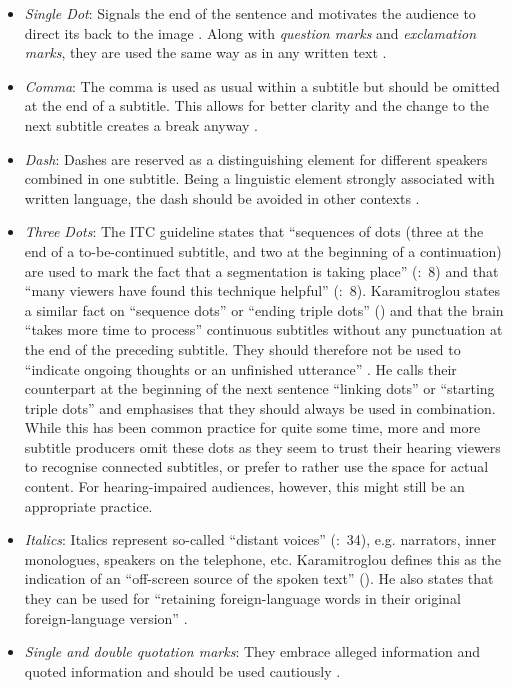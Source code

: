 \begin{itemize}
\item \textit{Single Dot}: Signals the end of the sentence and motivates the audience to direct its  back to the image \citep{Karamitroglou1998}. Along with \textit{question marks} and \textit{exclamation marks}, they are used the same way as in any written text \citep{Karamitroglou1998}.
\item \textit{Comma}: The comma is used as usual within a subtitle but should be omitted at the end of a subtitle. This allows for better clarity and the change to the next subtitle creates a break anyway \citep{Karamitroglou1998}.
\item \textit{Dash}: Dashes are reserved as a distinguishing element for different speakers combined in one subtitle. Being a linguistic element strongly associated with written language, the dash should be avoided in other contexts \citep{Karamitroglou1998}.
\item \textit{Three Dots}: The ITC guideline states that “sequences of dots (three at the end of a to-be-continued subtitle, and two at the beginning of a continuation) are used to mark the fact that a segmentation is taking place” (\citeyear{Itc1999}:~8) and that “many viewers have found this technique helpful” (\citeyear{Itc1999}:~8). Karamitroglou states a similar fact on “sequence dots” or “ending triple dots” (\citeyear{Karamitroglou1998}) and that the brain “takes more time to process” \citep{Karamitroglou1998} continuous subtitles without any punctuation at the end of the preceding subtitle. They should therefore not be used to “indicate ongoing thoughts or an unfinished utterance” \citep{Karamitroglou1998}. He calls their counterpart at the beginning of the next sentence “linking dots” or “starting triple dots” \citep{Karamitroglou1998} and emphasises that they should always be used in combination. While this has been common practice for quite some time, more and more subtitle producers omit these dots as they seem to trust their hearing viewers to recognise connected subtitles, or prefer to rather use the space for actual content. For hearing-impaired audiences, however, this might still be an appropriate practice.
\item \textit{Italics}: Italics represent so-called “distant voices” (\citealt{Leisner2009}:~34), e.g. narrators, inner monologues, speakers on the telephone, etc. Karamitroglou defines this as the indication of an “off-screen source of the spoken text” (\citeyear{Karamitroglou1998}). He also states that they can be used for “retaining foreign-language words in their original foreign-language version” \citep{Karamitroglou1998}.
\item \textit{Single and double quotation marks}: They embrace alleged information and quoted information and should be used cautiously \citep{Karamitroglou1998}.
\end{itemize}

